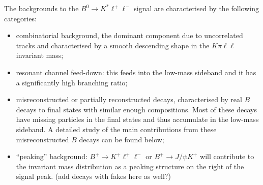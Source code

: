 The backgrounds to the $B^0 \to K^*\ell^+\ell^-$ signal
are characterised by the following categories:

\begin{itemize}
\item combinatorial background, the dominant component due
  to uncorrelated tracks and characterised by a smooth descending
  shape in the $K\pi\ell\ell$ invariant mass;
\item resonant channel feed-down: this feeds into the low-mass sideband
  and it has a significantly high branching ratio;
\item misreconstructed or partially reconstructed decays, characterised by
  real $B$ decays to final states with similar enough compositions. Most of
  these decays have missing particles in the final states and thus accumulate
  in the low-mass sideband. A detailed study of the main contributions
  from these misreconstructed $B$ decays can be found below;
\item ``peaking'' background: $B^+ \to K^+\ell^+\ell^-$ or $B^+ \to J/\psi K^+$
  will contribute to the invariant mass distribution as a peaking structure
  on the right of the signal peak. (add decays with fakes here as well?)
\end{itemize}


